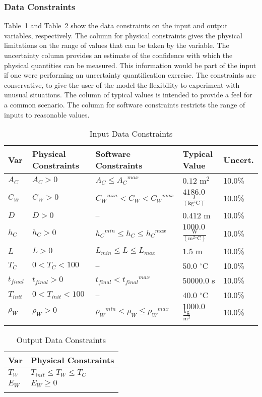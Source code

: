 \documentclass[12pt]{article}
\begin{document}
\subsubsection{Data Constraints}
\label{Sec:DataConstraints}
Table~\ref{Table:InDataConstraints} and Table~\ref{Table:OutDataConstraints} show the data constraints on the input and output variables, respectively. The column for physical constraints gives the physical limitations on the range of values that can be taken by the variable. The uncertainty column provides an estimate of the confidence with which the physical quantities can be measured. This information would be part of the input if one were performing an uncertainty quantification exercise. The constraints are conservative, to give the user of the model the flexibility to experiment with unusual situations. The column of typical values is intended to provide a feel for a common scenario. The column for software constraints restricts the range of inputs to reasonable values.
\begin{longtable}{l l l l l}
\toprule
Var & Physical Constraints & Software Constraints & Typical Value & Uncert.
\\
\midrule
${A_{C}}$ & ${A_{C}}>0$ & ${A_{C}}\leq{}{{A_{C}}^{max}}$ & $0.12$ $\text{m}^{2}$ & 10.0\%
\\
${C_{W}}$ & ${C_{W}}>0$ & ${{C_{W}}^{min}}<{C_{W}}<{{C_{W}}^{max}}$ & $4186.0$ $\frac{\text{J}}{(\text{kg}{}^{\circ}\text{C})}$ & 10.0\%
\\
$D$ & $D>0$ & -- & $0.412$ m & 10.0\%
\\
${h_{C}}$ & ${h_{C}}>0$ & ${{h_{C}}^{min}}\leq{}{h_{C}}\leq{}{{h_{C}}^{max}}$ & $1000.0$ $\frac{\text{W}}{(\text{m}^{2}{}^{\circ}\text{C})}$ & 10.0\%
\\
$L$ & $L>0$ & ${L_{min}}\leq{}L\leq{}{L_{max}}$ & $1.5$ m & 10.0\%
\\
${T_{C}}$ & $0<{T_{C}}<100$ & -- & $50.0$ ${}^{\circ}$C & 10.0\%
\\
${t_{final}}$ & ${t_{final}}>0$ & ${t_{final}}<{{t_{final}}^{max}}$ & $50000.0$ s & 10.0\%
\\
${T_{init}}$ & $0<{T_{init}}<100$ & -- & $40.0$ ${}^{\circ}$C & 10.0\%
\\
${ρ_{W}}$ & ${ρ_{W}}>0$ & ${{ρ_{W}}^{min}}<{ρ_{W}}\leq{}{{ρ_{W}}^{max}}$ & $1000.0$ $\frac{\text{kg}}{\text{m}^{3}}$ & 10.0\%
\\
\bottomrule
\caption{Input Data Constraints}
\label{Table:InDataConstraints}
\end{longtable}
\begin{longtable}{l l}
\toprule
Var & Physical Constraints
\\
\midrule
${T_{W}}$ & ${T_{init}}\leq{}{T_{W}}\leq{}{T_{C}}$
\\
${E_{W}}$ & ${E_{W}}\geq{}0$
\\
\bottomrule
\caption{Output Data Constraints}
\label{Table:OutDataConstraints}
\end{longtable}
\end{document}
